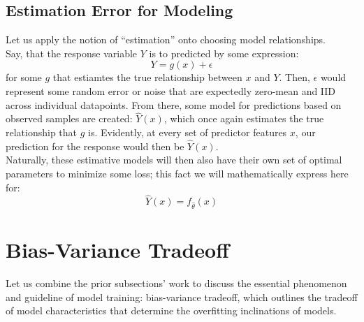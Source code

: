 \subsection{Estimation Error for Modeling}
Let us apply the notion of ``estimation'' onto choosing model relationships. \\
Say, that the response variable $Y$ is to predicted by some expression:
\[Y = g(x) + \epsilon\]
for some $g$ that estiamtes the true relationship between $x$ and $Y$. Then, $\epsilon$ would represent some random error or noise that are expectedly zero-mean and IID across individual datapoints.
From there, some model for predictions based on observed samples are created: $\hat{Y}(x)$, which once again estimates the true relationship that $g$ is. Evidently, at every set of predictor features $x$, our prediction for the response would then be $\hat{Y}(x)$. \\
Naturally, these estimative models will then also have their own set of optimal parameters to minimize some loss; this fact we will mathematically express here for:
\[\hat{Y}(x) = f_{\hat{\theta}}(x)\]

\section{Bias-Variance Tradeoff}
Let us combine the prior subsections' work to discuss the essential phenomenon and guideline of model training: bias-variance tradeoff, which outlines the tradeoff of model characteristics that determine the overfitting inclinations of models.

